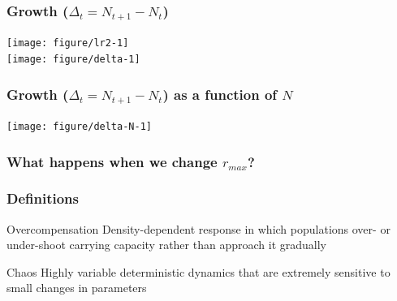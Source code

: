 \documentclass[color=usenames,dvipsnames]{beamer}\usepackage[]{graphicx}\usepackage[]{xcolor}
\begin{document}
\begin{frame}[fragile]
  \frametitle{Growth ($\Delta_t=N_{t+1}-N_t$)}


\begin{center}
  \texttt{[image: figure/lr2-1]} \\ \vfill
  \texttt{[image: figure/delta-1]}
\end{center}
\end{frame}



\begin{frame}[fragile]
  \frametitle{Growth ($\Delta_t=N_{t+1}-N_t$) as a function of $N$}

\begin{center}
  \texttt{[image: figure/delta-N-1]}
\end{center}
\end{frame}






\begin{frame}[fragile]
  \frametitle{What happens when we change $r_{max}$?}





\begin{center}
\end{center}
\end{frame}





\begin{frame}
  \frametitle{Definitions}
  \begin{block}{Overcompensation}
    Density-dependent response in which populations over- or
    under-shoot carrying capacity rather than approach it gradually
  \end{block}
  \pause
  \begin{block}{Chaos}
    Highly variable deterministic dynamics that are extremely
    sensitive to small changes in parameters
  \end{block}
\end{frame}






%
\end{document}
